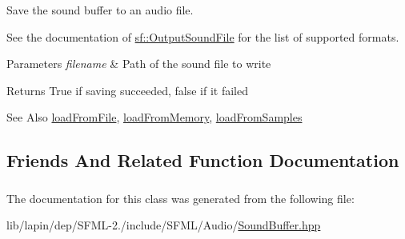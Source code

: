 Save the sound buffer to an audio file. 

See the documentation of \hyperlink{classsf_1_1_output_sound_file}{sf\-::\-Output\-Sound\-File} for the list of supported formats.


\begin{DoxyParams}{Parameters}
{\em filename} & Path of the sound file to write\\
\hline
\end{DoxyParams}
\begin{DoxyReturn}{Returns}
True if saving succeeded, false if it failed
\end{DoxyReturn}
\begin{DoxySeeAlso}{See Also}
\hyperlink{classsf_1_1_sound_buffer_a2be6a8025c97eb622a7dff6cf2594394}{load\-From\-File}, \hyperlink{classsf_1_1_sound_buffer_af8cfa5599739a7edae69c5cba273d33f}{load\-From\-Memory}, \hyperlink{classsf_1_1_sound_buffer_a42d51ce4bb3b60c7ea06f63c273fd063}{load\-From\-Samples} 
\end{DoxySeeAlso}


\subsection{Friends And Related Function Documentation}
\hypertarget{classsf_1_1_sound_buffer_a78d488655886fd6a1355b1162fba927f}{
\subsubsection[{Sound}]{\hspace{0.3cm}{\ttfamily [friend]}}}\label{classsf_1_1_sound_buffer_a78d488655886fd6a1355b1162fba927f}


The documentation for this class was generated from the following file\-:\begin{DoxyCompactItemize}
\item 
lib/lapin/dep/\-S\-F\-M\-L-\/2./include/\-S\-F\-M\-L/\-Audio/\hyperlink{lapin_2dep_2_s_f_m_l-2_83_2include_2_s_f_m_l_2_audio_2_sound_buffer_8hpp}{Sound\-Buffer.\-hpp}\end{DoxyCompactItemize}
